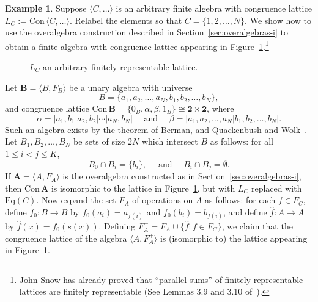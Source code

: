 \documentclass[cm,dissertation,actual,final]{uhthesis}
\theoremstyle{plain}
\theoremstyle{definition}
\newtheorem{example}[theorem]{Example}
\newcounter{claim}
\theoremstyle{remark}
\numberwithin{theorem}{section}
\numberwithin{claim}{chapter}
\numberwithin{equation}{section}
\numberwithin{conjecture}{chapter}
\newcommand{\<}{\ensuremath{\langle}}
\renewcommand{\>}{\ensuremath{\rangle}}
\renewcommand{\leq}{\ensuremath{\leqslant}}
\newcommand{\Eq}{\ensuremath{\mathrm{Eq}}}
\newcommand{\Con}{\ensuremath{\mathrm{Con\,}}}
\newcommand{\0}{\ensuremath{\mathbf{0}}}
\newcommand{\1}{\ensuremath{\mathbf{1}}}
\newcommand{\2}{\ensuremath{\mathbf{2}}}
\newcommand{\3}{\ensuremath{\mathbf{3}}}
\newcommand{\4}{\ensuremath{\mathbf{4}}}
\newcommand{\5}{\ensuremath{\mathbf{5}}}
\newcommand{\bA}{\ensuremath{\mathbf{A}}}
\newcommand{\bB}{\ensuremath{\mathbf{B}}}
\newcommand{\two}{\ensuremath{\mathbf{2}}}
\begin{document}
  \begin{example}
    \label{ex:conclusion}
    Suppose $\<C, \dots\>$ is an arbitrary finite algebra with congruence lattice 
    $L_C := \Con \<C, \dots\>$. Relabel the elements so that $C = \{1, 2, \dots, N\}$.
    We show how to use the overalgebra construction described in
    Section~\ref{sec:overalgebras-i} to obtain a finite algebra with congruence
    lattice appearing in Figure~\ref{fig:conclusion}.\footnote{John
      Snow 
      has already proved that ``parallel sums'' of finitely representable
      lattices are finitely representable (See Lemmas 3.9 and 3.10
      of~\cite{Snow:2000}).
    }

    \begin{figure}[h!]
      \centering
      \caption{%
        $L_C$ an arbitrary finitely 
        representable lattice.}
      \label{fig:conclusion}
    \end{figure}

    Let $\bB = \<B, F_B\>$  be a unary algebra with universe 
    \[
    B = \{a_1, a_2, \dots, a_N, b_1, b_2, \dots, b_N \},
    \]
    and congruence lattice
    $\Con\bB = \{0_B, \alpha, \beta, 1_B\} \cong \two \times \two$, where
    \[
    \alpha = |a_1, b_1 | a_2, b_2 | \cdots | a_N, b_N | \quad \text{ and } \quad
    \beta = |a_1, a_2, \dots, a_N | b_1, b_2, \dots, b_N |.
    \]
    Such an algebra exists by the theorem of Berman\cite{Berman:1970}, and Quackenbush and
    Wolk~\cite{Quack:1971}.
    Let $B_1, B_2, \dots, B_N$ be sets of size $2N$ which intersect $B$ as
    follows:
    for all $1 \leq i < j \leq K$,
    \[
    B_0\cap B_i = \{b_i\}, \quad \text{ and } \quad B_i \cap B_j = \emptyset.
    \]
    If $\bA = \< A, F_A\>$ is the overalgebra constructed as in
    Section~\ref{sec:overalgebras-i}, then $\Con \bA$ is isomorphic to the lattice
    in Figure~\ref{fig:conclusion}, but with $L_C$ replaced with $\Eq(C)$.  Now
    expand the set $F_A$ of operations on $A$ as follows: for each $f\in F_C$,
    define $f_0: B\rightarrow B$ by $f_0(a_i) = a_{f(i)}$ and 
    $f_0(b_i) = b_{f(i)}$, and define $\hat{f}: A\rightarrow A$ by $\hat{f}(x) =
    f_0(s(x))$. Defining $F^+_A = F_A \cup \{\hat{f} : f\in F_C\}$, we claim that
    the congruence lattice of the algebra $\< A, F^+_A\>$ is (isomorphic to) the
    lattice appearing in Figure~\ref{fig:conclusion}.
  \end{example}
\end{document}
